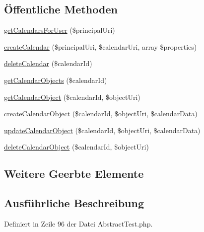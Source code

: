 \subsection*{Öffentliche Methoden}
\begin{DoxyCompactItemize}
\item 
\mbox{\hyperlink{class_sabre_1_1_cal_d_a_v_1_1_backend_1_1_abstract_mock_a0393f4b2e85e510e01d8f7f7b3bc1a08}{get\+Calendars\+For\+User}} (\$principal\+Uri)
\item 
\mbox{\hyperlink{class_sabre_1_1_cal_d_a_v_1_1_backend_1_1_abstract_mock_af3c77f7cc777eb7a101be58d96bf6d85}{create\+Calendar}} (\$principal\+Uri, \$calendar\+Uri, array \$properties)
\item 
\mbox{\hyperlink{class_sabre_1_1_cal_d_a_v_1_1_backend_1_1_abstract_mock_aedd71ef0fb853eb8159e273ecc90f909}{delete\+Calendar}} (\$calendar\+Id)
\item 
\mbox{\hyperlink{class_sabre_1_1_cal_d_a_v_1_1_backend_1_1_abstract_mock_aa0031bf1754b41a98eeb26d987138a18}{get\+Calendar\+Objects}} (\$calendar\+Id)
\item 
\mbox{\hyperlink{class_sabre_1_1_cal_d_a_v_1_1_backend_1_1_abstract_mock_a535e8d21a6d1a05d95ede428fa40a3fe}{get\+Calendar\+Object}} (\$calendar\+Id, \$object\+Uri)
\item 
\mbox{\hyperlink{class_sabre_1_1_cal_d_a_v_1_1_backend_1_1_abstract_mock_a7f1cb4ae7e7c74e88db0eaf853b1c245}{create\+Calendar\+Object}} (\$calendar\+Id, \$object\+Uri, \$calendar\+Data)
\item 
\mbox{\hyperlink{class_sabre_1_1_cal_d_a_v_1_1_backend_1_1_abstract_mock_a478a6153bbae1f88081672c914754e57}{update\+Calendar\+Object}} (\$calendar\+Id, \$object\+Uri, \$calendar\+Data)
\item 
\mbox{\hyperlink{class_sabre_1_1_cal_d_a_v_1_1_backend_1_1_abstract_mock_a899605a43f9aaba1742ab62ece53a66a}{delete\+Calendar\+Object}} (\$calendar\+Id, \$object\+Uri)
\end{DoxyCompactItemize}
\subsection*{Weitere Geerbte Elemente}


\subsection{Ausführliche Beschreibung}


Definiert in Zeile 96 der Datei Abstract\+Test.\+php.



